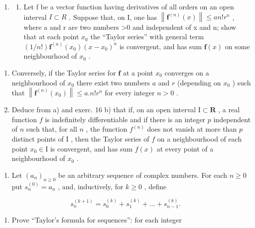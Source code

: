 \begin{enumerate}
\def\labelenumi{\arabic{enumi})}
\setcounter{enumi}{16}
\tightlist
\item
  \begin{enumerate}
  \def\labelenumii{\alph{enumii})}
  \tightlist
  \item
    Let f be a vector function having derivatives of all orders on an open interval \(I \subset R\) . Suppose that, on I, one has \(\left\|\mathbf{f}^{(n)}(x)\right\| \leqslant a n!r^n\) , where a and r are two numbers \textgreater0 and independent of x and n; show that at each point \(x_0\) the ``Taylor series'' with general term \((1/n!) \mathbf{f}^{(n)}(x_0)(x - x_0)^n\) is convergent, and has sum \(\mathbf{f}(x)\) on some neighbourhood of \(x_0\) .
  \end{enumerate}
\end{enumerate}

\begin{enumerate}
\def\labelenumi{\alph{enumi})}
\setcounter{enumi}{1}
\item
  Conversely, if the Taylor series for \(\mathbf{f}\) at a point \(x_0\) converges on a neighbourhood of \(x_0\) there exist two numbers \(a\) and \(r\) (depending on \(x_0\) ) such that \(\left\| \mathbf{f}^{(n)}(x_0)\right\| \leqslant a.n!r^n\) for every integer \(n > 0\) .
\item
  Deduce from a) and exerc. 16 b) that if, on an open interval \(\mathrm{I} \subset \mathbf{R}\) , a real function \(f\) is indefinitely differentiable and if there is an integer \(p\) independent of \(n\) such that, for all \(n\) , the function \(f^{(n)}\) does not vanish at more than \(p\) distinct points of \(\mathrm{I}\) , then the Taylor series of \(f\) on a neighbourhood of each point \(x_0 \in \mathrm{I}\) is convergent, and has sum \(f(x)\) at every point of a neighbourhood of \(x_0\) .
\end{enumerate}

\begin{enumerate}
\def\labelenumi{\arabic{enumi})}
\setcounter{enumi}{17}
\tightlist
\item
  Let \((a_{n})_{n\geqslant 0}\) be an arbitrary sequence of complex numbers. For each \(n\geqslant 0\) put \(s_n^{(0)} = a_n\) , and, inductively, for \(k\geqslant 0\) , define
\end{enumerate}

\[
s _ {n} ^ {(k + 1)} = s _ {0} ^ {(k)} + s _ {1} ^ {(k)} + \dots + s _ {n - 1} ^ {(k)}.
\]

\begin{enumerate}
\def\labelenumi{\alph{enumi})}
\tightlist
\item
  Prove ``Taylor's formula for sequences'': for each integer
\end{enumerate}

